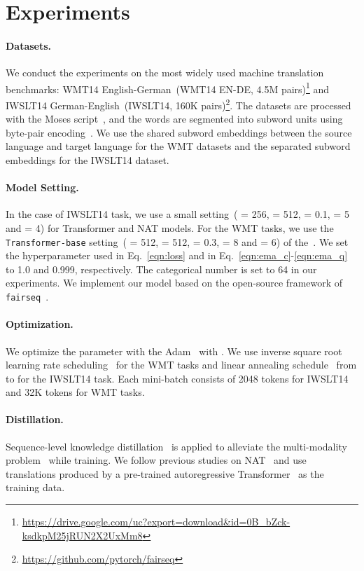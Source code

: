 \section{Experiments}\label{s:exp}
\paragraph{Datasets.} 
We conduct the experiments on the most widely used machine translation benchmarks: WMT14 English-German~(WMT14 EN-DE, 4.5M pairs)\footnote{\url{https://drive.google.com/uc?export=download&id=0B_bZck-ksdkpM25jRUN2X2UxMm8}} and IWSLT14 German-English~(IWSLT14, 160K pairs)\footnote{ \url{https://github.com/pytorch/fairseq}}. 
The datasets are processed with the Moses script~\citep{Moses}, and the words are segmented into subword units using byte-pair encoding~\citep[BPE]{bpe}.  
We use the shared subword embeddings between the source language and target language for the WMT datasets and the separated subword embeddings for the IWSLT14 dataset.
   
\paragraph{Model Setting.} 
In the case of IWSLT14 task, we use a small setting~( = 256,  = 512,  = 0.1,  = 5 and  = 4) for Transformer and NAT models. 
For the WMT tasks, we use the \texttt{Transformer-base} setting~( = 512,  = 512,  = 0.3,  = 8 and  = 6) of the~\citet{transformer}. 
We set the hyperparameter  used in Eq.~\ref{eqn:loss} and  in Eq.~\ref{eqn:ema_c}-\ref{eqn:ema_q} to 1.0 and 0.999, respectively.
The categorical number  is set to 64 in our experiments.
We implement our model based on the open-source framework of \texttt{fairseq}~\cite{fairseq}.

\paragraph{Optimization.} 
We optimize the parameter with the Adam~\citep{adam} with . 
We use inverse square root learning rate scheduling~\citep{transformer} for the WMT tasks and linear annealing schedule~\cite{iter_nat} from  to  for the IWSLT14 task.
Each mini-batch consists of 2048 tokens for IWSLT14 and 32K tokens for WMT tasks.

\paragraph{Distillation.}
Sequence-level knowledge distillation~\citep{hinton2015distilling} is applied to alleviate the multi-modality problem~\cite{nat} while training. 
We follow previous studies on NAT~\citep{nat,iter_nat,imitate_nat} and use translations produced by a pre-trained autoregressive Transformer~\cite{transformer} as the training data.


